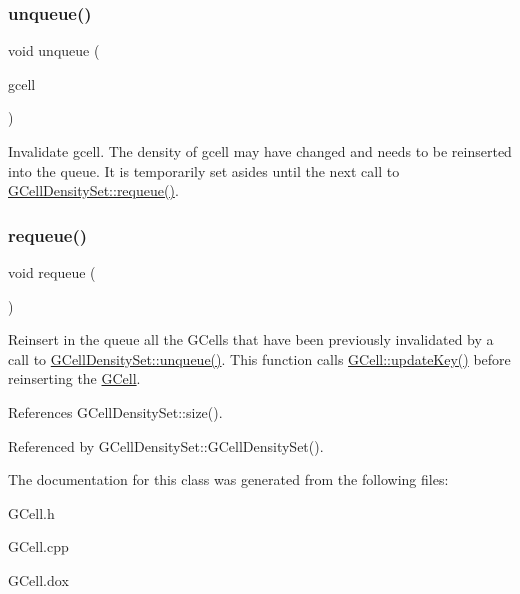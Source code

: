 \subsubsection{\texorpdfstring{unqueue()}{unqueue()}}
{\footnotesize\ttfamily void unqueue (\begin{DoxyParamCaption}\item[{\hyperlink{classKatabatic_1_1GCell}{G\+Cell} $\ast$}]{gcell }\end{DoxyParamCaption})\hspace{0.3cm}{\ttfamily [inline]}}

Invalidate {\ttfamily gcell}. The density of {\ttfamily gcell} may have changed and needs to be reinserted into the queue. It is temporarily set asides until the next call to \hyperlink{classKatabatic_1_1GCellDensitySet_ac84efe46d8a3c409e85bc3420240c3c2}{G\+Cell\+Density\+Set\+::requeue()}. \mbox{\label{classKatabatic_1_1GCellDensitySet_ac84efe46d8a3c409e85bc3420240c3c2}} 
\subsubsection{\texorpdfstring{requeue()}{requeue()}}
{\footnotesize\ttfamily void requeue (\begin{DoxyParamCaption}{ }\end{DoxyParamCaption})}

Reinsert in the queue all the G\+Cells that have been previously invalidated by a call to \hyperlink{classKatabatic_1_1GCellDensitySet_a89099ec88eadcadb942b7d64a6ffd7ee}{G\+Cell\+Density\+Set\+::unqueue()}. This function calls \hyperlink{classKatabatic_1_1GCell_a11beff0f0bec06d0f3e080969516dfc3}{G\+Cell\+::update\+Key()} before reinserting the \hyperlink{classKatabatic_1_1GCell}{G\+Cell}. 

References G\+Cell\+Density\+Set\+::size().



Referenced by G\+Cell\+Density\+Set\+::\+G\+Cell\+Density\+Set().



The documentation for this class was generated from the following files\+:\begin{DoxyCompactItemize}
\item 
G\+Cell.\+h\item 
G\+Cell.\+cpp\item 
G\+Cell.\+dox\end{DoxyCompactItemize}
